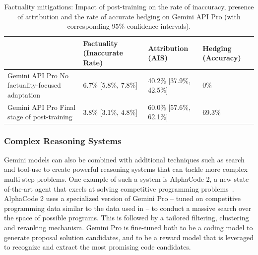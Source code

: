 \begin{table}[ht!]
    \centering
    \scriptsize
    \begin{tabular}{p{4.0cm}p{3.0cm}p{3.0cm}p{3.0cm}}
    \toprule
& Factuality \newline
\tiny{(Inaccurate Rate)} & Attribution \newline
\tiny{(AIS)} & Hedging \newline
\tiny{(Accuracy)} \\
\midrule
Gemini API Pro \newline
No factuality-focused adaptation & 6.7\% \newline \tiny{[5.8\%, 7.8\%]} & 40.2\% \newline
\tiny{[37.9\%, 42.5\%]} & 0\% \\
\addlinespace[2ex]
Gemini API Pro \newline
Final stage of post-training & 3.8\% \newline \tiny{[3.1\%, 4.8\%]} & 60.0\% \newline
\tiny{[57.6\%, 62.1\%]} & 69.3\% \\
\bottomrule
\end{tabular}
\caption{Factuality mitigations: Impact of post-training on the rate of inaccuracy, presence of attribution and the rate of accurate hedging on Gemini API Pro (with corresponding 95\% confidence intervals).}
\label{table:factuality}
\end{table}

 \subsubsection{Complex Reasoning Systems}
\label{sec:complex-reasoning}
Gemini models can also be combined with additional techniques such as search and tool-use to create powerful reasoning systems that can tackle more complex multi-step problems. 
One example of such a system is AlphaCode 2, a new state-of-the-art agent that excels at solving competitive programming problems~\citep{gdm2023alphacode2}. 
AlphaCode 2 uses a specialized version of Gemini Pro – tuned on competitive programming data similar to the data used in \citet{alphacode} – to conduct a massive search over the space of possible programs. This is followed by a tailored filtering, clustering and reranking mechanism. Gemini Pro is fine-tuned both to be a coding model to generate proposal solution candidates, and to be a reward model that is leveraged to recognize and extract the most promising code candidates.

